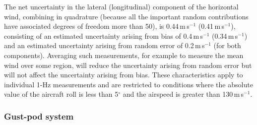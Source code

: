 \documentclass[12pt,twoside,english]{article}\usepackage[]{graphicx}\usepackage[]{color}
\begin{document}
{{{\begin{minipage}[t]{.95\textwidth}
The net uncertainty in the lateral (longitudinal) component of the horizontal wind, combining in quadrature (because all the important random contributions have associated degrees of freedom more than 50), is 0.44\,m\,s$^{-1}$ (0.41\,m\,s$^{-1}$), consisting of an estimated uncertainty arising from bias of 0.4\,m\,s$^{-1}$ (0.34\,m\,s$^{-1}$) and an estimated uncertainty arising from random error of 0.2\,m\,s$^{-1}$ (for both components). Averaging such measurements, for example to measure the mean wind over some region, will reduce the uncertainty arising from random error but will not affect the uncertainty arising from bias. These characteristics apply to individual 1-Hz measurements and are restricted to conditions where the absolute value of the aircraft roll is less than 5$^{\circ}$ and the airspeed is greater than 130\,m\,s$^{-1}$. 
\end{minipage}}



\subsubsection{Gust-pod system}

}}
\end{document}
